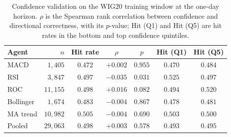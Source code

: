 \documentclass{ieeeaccess}
\begin{document}
\begin{table}[t]
\centering
\setlength{\tabcolsep}{4pt}
\caption{Confidence validation on the WIG20 training window at the one-day horizon. $\rho$ is the Spearman rank correlation between confidence and directional correctness, with its $p$-value; Hit (Q1) and Hit (Q5) are hit rates in the bottom and top confidence quintiles.}
\label{tab:confvalid}
\begin{tabular}{lrccccc}
\toprule
Agent & $n$ & Hit rate & $\rho$ & $p$ & Hit (Q1) & Hit (Q5) \\
\midrule
MACD & $1{,}405$ & $0.472$ & $+0.002$ & $0.955$ & $0.470$ & $0.484$ \\
RSI & $3{,}847$ & $0.497$ & $-0.035$ & $0.031$ & $0.525$ & $0.497$ \\
ROC & $11{,}155$ & $0.498$ & $+0.016$ & $0.082$ & $0.494$ & $0.520$ \\
Bollinger & $1{,}674$ & $0.483$ & $-0.004$ & $0.867$ & $0.478$ & $0.481$ \\
MA trend & $10{,}982$ & $0.505$ & $-0.004$ & $0.690$ & $0.503$ & $0.500$ \\
Pooled & $29{,}063$ & $0.498$ & $+0.003$ & $0.578$ & $0.493$ & $0.495$ \\
\bottomrule
\end{tabular}
\end{table}
\end{document}
